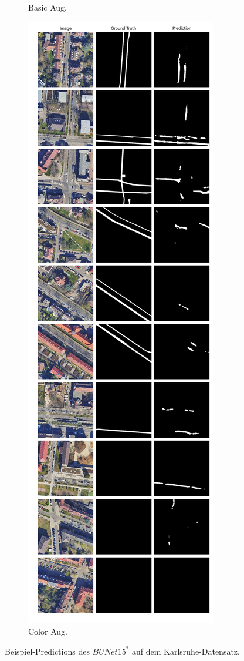 \begin{figure}
\begin{subfigure}{.4\textwidth}
		\caption{Basic Aug.}
	\end{subfigure}
	\begin{subfigure}{.4\textwidth}
		\centering
		\includegraphics[width=1.\textwidth]{Bilder/karlsruhe-color-samples/bunet15-s.png}
		\caption{Color Aug.}
	\end{subfigure}
	\caption{Beispiel-Predictions des $BUNet15^*$ auf dem Karlsruhe-Datensatz.}
	\label{fig:ka-samples-bunet15-s}
	\end{figure}
	
